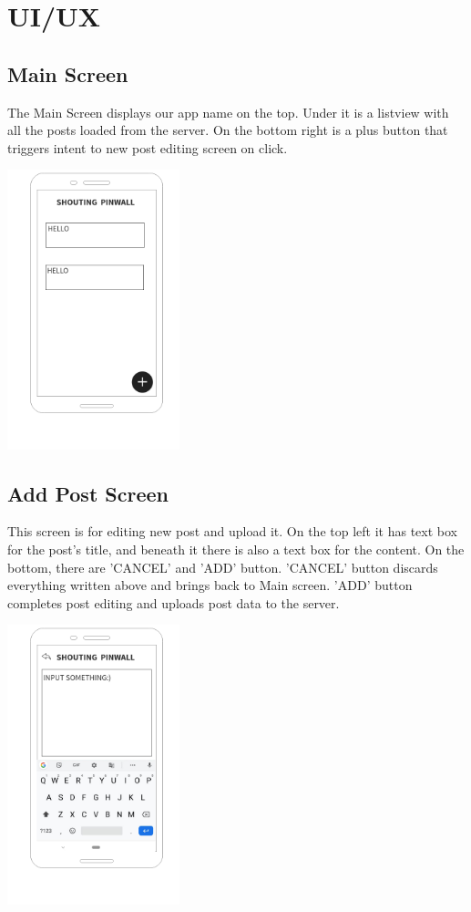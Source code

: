 \documentclass[conference]{IEEEtran}
\numberwithin{figure}{subsection}
\begin{document}
\section{UI/UX}
\subsection{Main Screen}
The Main Screen displays our app name on the top. Under it is a listview with all the posts loaded from the server. On the bottom right is a plus button that triggers intent to new post editing screen on click.\\

\begin{center}
\includegraphics[width=5cm]{bibtex/images/Home_Screen.png}
\end{center}

\subsection{Add Post Screen}
This screen is for editing new post and upload it. On the top left it has text box for the post's title, and beneath it there is also a text box for the content. On the bottom, there are 'CANCEL' and 'ADD' button. 'CANCEL' button discards everything written above and brings back to Main screen. 'ADD' button completes post editing and uploads post data to the server.\\

\begin{center}
\includegraphics[width=5cm]{bibtex/images/Add_Post_Screen.png}
\end{center}
\end{document}
